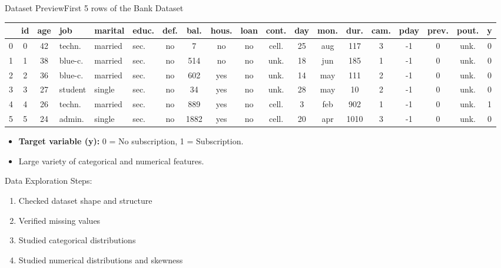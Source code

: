 \documentclass[slidescentered]{beamer}
\begin{document}
\begin{frame}{Dataset Preview}{First 5 rows of the Bank Dataset}
    \begin{center}
    \tiny
    \addtolength{\tabcolsep}{-4pt} %
    \begin{tabular}{|l|c|c|l|l|l|c|c|c|c|c|c|c|c|c|c|c|c|c|}
    \hline
    \textbf{} & \textbf{id} & \textbf{age} & \textbf{job} & \textbf{marital} & \textbf{educ.} & \textbf{def.} & \textbf{bal.} & \textbf{hous.} & \textbf{loan} & \textbf{cont.} & \textbf{day} & \textbf{mon.} & \textbf{dur.} & \textbf{cam.} & \textbf{pday} & \textbf{prev.} & \textbf{pout.} & \textbf{y} \\ \hline
    0 & 0 & 42 & techn. & married & sec. & no & 7 & no & no & cell. & 25 & aug & 117 & 3 & -1 & 0 & unk. & 0 \\ \hline
    1 & 1 & 38 & blue-c. & married & sec. & no & 514 & no & no & unk. & 18 & jun & 185 & 1 & -1 & 0 & unk. & 0 \\ \hline
    2 & 2 & 36 & blue-c. & married & sec. & no & 602 & yes & no & unk. & 14 & may & 111 & 2 & -1 & 0 & unk. & 0 \\ \hline
    3 & 3 & 27 & student & single & sec. & no & 34 & yes & no & unk. & 28 & may & 10 & 2 & -1 & 0 & unk. & 0 \\ \hline
    4 & 4 & 26 & techn. & married & sec. & no & 889 & yes & no & cell. & 3 & feb & 902 & 1 & -1 & 0 & unk. & 1 \\ \hline
    5 & 5 & 24 & admin. & single & sec. & no & 1882 & yes & no & cell. & 20 & apr & 1010 & 3 & -1 & 0 & unk. & 0 \\ \hline
    \end{tabular}
    \end{center}

    \vspace{0.5cm}
    \begin{itemize}
        \item \textbf{Target variable (y):} 0 = No subscription, 1 = Subscription.
        \item Large variety of categorical and numerical features.
    \end{itemize}
\end{frame}



\begin{frame}{Data Exploration}
Steps:
\begin{enumerate}
\item Checked dataset shape and structure
\item Verified missing values
\item Studied categorical distributions
\item Studied numerical distributions and skewness
\end{enumerate}
\end{frame}
\end{document}
